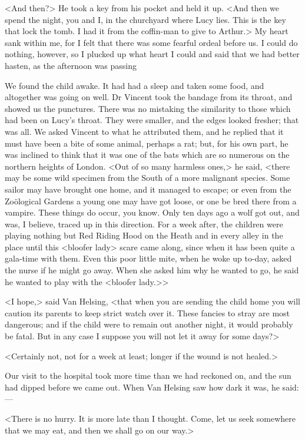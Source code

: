 <And then?> He took a key from his pocket and held it up. <And then we spend the night, you and I, in the churchyard where Lucy lies. This is the key that lock the tomb. I had it from the coffin-man to give to Arthur.> My heart sank within me, for I felt that there was some fearful ordeal before us. I could do nothing, however, so I plucked up what heart I could and said that we had better hasten, as the afternoon was passing

We found the child awake. It had had a sleep and taken some food, and altogether was going on well. Dr Vincent took the bandage from its throat, and showed us the punctures. There was no mistaking the similarity to those which had been on Lucy's throat. They were smaller, and the edges looked fresher; that was all. We asked Vincent to what he attributed them, and he replied that it must have been a bite of some animal, perhaps a rat; but, for his own part, he was inclined to think that it was one of the bats which are so numerous on the northern heights of London. <Out of so many harmless ones,> he said, <there may be some wild specimen from the South of a more malignant species. Some sailor may have brought one home, and it managed to escape; or even from the Zoölogical Gardens a young one may have got loose, or one be bred there from a vampire. These things do occur, you know. Only ten days ago a wolf got out, and was, I believe, traced up in this direction. For a week after, the children were playing nothing but Red Riding Hood on the Heath and in every alley in the place until this <bloofer lady> scare came along, since when it has been quite a gala-time with them. Even this poor little mite, when he woke up to-day, asked the nurse if he might go away. When she asked him why he wanted to go, he said he wanted to play with the <bloofer lady.>>

<I hope,> said Van Helsing, <that when you are sending the child home you will caution its parents to keep strict watch over it. These fancies to stray are most dangerous; and if the child were to remain out another night, it would probably be fatal. But in any case I suppose you will not let it away for some days?>

<Certainly not, not for a week at least; longer if the wound is not healed.>

Our visit to the hospital took more time than we had reckoned on, and the sun had dipped before we came out. When Van Helsing saw how dark it was, he said:—

<There is no hurry. It is more late than I thought. Come, let us seek somewhere that we may eat, and then we shall go on our way.>

